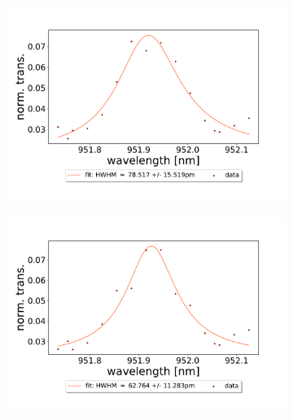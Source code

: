 \begin{figure}[h!]
\begin{subfigure}[b]{0.49\textwidth}
        \includegraphics[width=\textwidth]{figures/results/double fano fits/20250326/83um_M3:M5_fit_3.pdf}
        \caption{}
        \label{fig:83um_M3:M5_fit_3}
    \end{subfigure}
    \begin{subfigure}[b]{0.49\textwidth}
        \includegraphics[width=\textwidth]{figures/results/double fano fits/20250326/83um_M3:M5_fit_4.pdf}
        \caption{}
        \label{fig:83um_M3:M5_fit_4}
    \end{subfigure}
    \begin{subfigure}[b]{0.49\textwidth}

\end{subfigure}
\end{figure}
